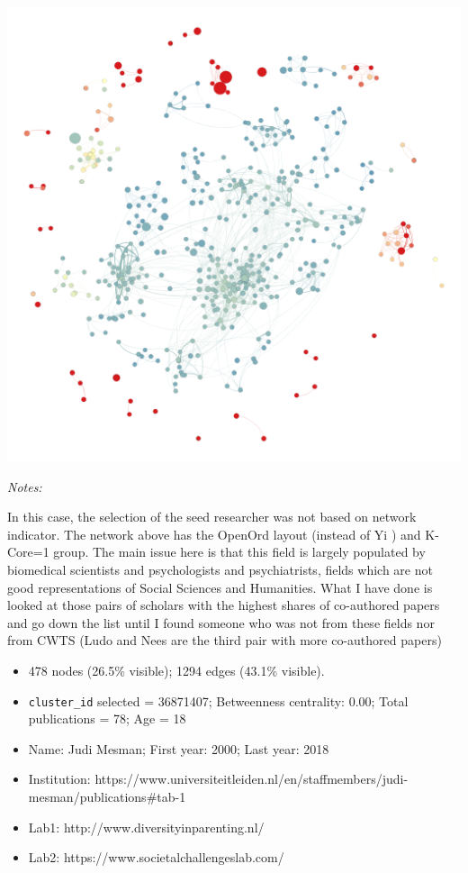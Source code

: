 \documentclass[]{elsarticle} %
\makeatletter
\providecommand{\tightlist}{%
  \setlength{\itemsep}{0pt}\setlength{\parskip}{0pt}}
\def\maxwidth{\ifdim\Gin@nat@width>\linewidth\linewidth
\else\Gin@nat@width\fi}
\let\Oldincludegraphics\includegraphics
\renewcommand{\includegraphics}[1]{\Oldincludegraphics[width=\maxwidth]{#1}}
\makeatother
\begin{document}
\includegraphics{figs/lu_soc_betweenness.png}

\emph{Notes:}

In this case, the selection of the seed researcher was not based on
network indicator. The network above has the OpenOrd layout (instead of
Yi ) and K-Core=1 group. The main issue here is that this field is
largely populated by biomedical scientists and psychologists and
psychiatrists, fields which are not good representations of Social
Sciences and Humanities. What I have done is looked at those pairs of
scholars with the highest shares of co-authored papers and go down the
list until I found someone who was not from these fields nor from CWTS
(Ludo and Nees are the third pair with more co-authored papers)

\begin{itemize}
\tightlist
\item
  478 nodes (26.5\% visible); 1294 edges (43.1\% visible).
\item
  \texttt{cluster\_id} selected = 36871407; Betweenness centrality:
  0.00; Total publications = 78; Age = 18
\item
  Name: Judi Mesman; First year: 2000; Last year: 2018
\item
  Institution:
  https://www.universiteitleiden.nl/en/staffmembers/judi-mesman/publications\#tab-1
\item
  Lab1: http://www.diversityinparenting.nl/
\item
  Lab2: https://www.societalchallengeslab.com/
\end{itemize}
\end{document}
